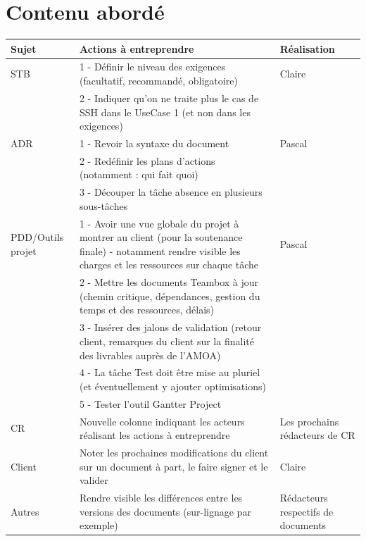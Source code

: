 \documentclass[a4paper,11pt,french]{article}
\begin{document}
\section{Contenu abordé}
\begin{center}

\begin{tabular}{ | p{3cm} | p{11cm} | p{3cm} |}
        \hline
   \textbf{Sujet} & \textbf{Actions à entreprendre} & \textbf{Réalisation}   \\ \hline
 STB & 1 - Définir le niveau des exigences (facultatif, recommandé, obligatoire) & Claire \\ 
 & 2 - Indiquer qu'on ne traite plus le cas de SSH dans le UseCase 1 (et non dans les exigences) &   \\ \hline
ADR & 1 - Revoir la syntaxe du document & Pascal\\
        & 2 - Redéfinir les plans d'actions (notamment : qui fait quoi) & \\
        & 3 - Découper la tâche absence en plusieurs sous-tâches & \\ \hline
PDD/Outils projet & 1 - Avoir une vue globale du projet à montrer au client (pour la soutenance finale) - notamment rendre visible les charges et les ressources sur chaque tâche & Pascal \\
		 & 2 - Mettre les documents Teambox à jour (chemin critique, dépendances, gestion du temps et des ressources, délais) & \\
		& 3 - Insérer des jalons de validation (retour client, remarques du client sur la finalité des livrables auprès de l'AMOA) & \\
		& 4 - La tâche Test doit être mise au pluriel (et éventuellement y ajouter optimisations) & \\
		& 5 - Tester l'outil Gantter Project & 
		\\ \hline
CR &  Nouvelle colonne indiquant les acteurs réalisant les actions à entreprendre & Les prochains rédacteurs de CR \\ \hline
Client &  Noter les prochaines modifications du client sur un document à part, le faire signer et le valider & Claire \\ \hline
Autres &  Rendre visible les différences entre les versions des documents (sur-lignage par exemple) & Rédacteurs respectifs de documents \\ \hline
 \end{tabular}
 
\end{center}
\end{document}
